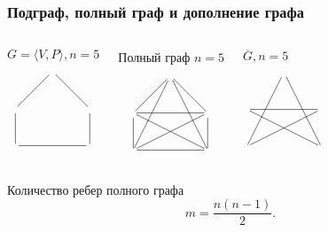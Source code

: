\begin{frame}
    \frametitle{Подграф, полный граф и дополнение графа}

    \begin{columns}
            \begin{block}{$G=\langle V,P\rangle,n=5$}
                \[
                    {\xymatrix{
                        *{} 
                            & \ar@{-}[dr] \ar@{-}[dl] 
                                &*{}
                                    \\
                        {} 
                            &*{}
                                & \ar@{-}[d] 
                                    \\
                        \ar@{-}[u] 
                            &*{}
                                & \ar@{-}[ll]
                    }}
                \]
            \end{block}
        
            \begin{block}{Полный граф $n=5$}
                \[
                    {\xymatrix{
                        *{} 
                            & \ar@{-}[dr] \ar@{-}[ddr] \ar@{-}[ddl] \ar@{-}[dl] 
                                &*{}
                                    \\
                        {} 
                            &*{}
                                & \ar@{-}[d] \ar@{-}[dll] \ar@{-}[ll] 
                                    \\
                        \ar@{-}[u] 
                            &*{}
                                & \ar@{-}[ll] \ar@{-}[ull] 
                    }}
                \]
            \end{block}
            \begin{block}{$\overline{G}, n=5$}
                \[
                    {\xymatrix{
                        *{} 
                            & \ar@{-}[ddr] \ar@{-}[ddl] 
                                &*{}
                                    \\
                        {} 
                            &*{}
                                & \ar@{-}[dll] \ar@{-}[ll] 
                                    \\
                        {} 
                            &*{}
                                & \ar@{-}[ull] 
                    }}
                \]
            \end{block}
    \end{columns}
    
    Количество ребер полного графа 
    \[
        m=\frac{n(n-1)}{2}.
    \]
\end{frame}


